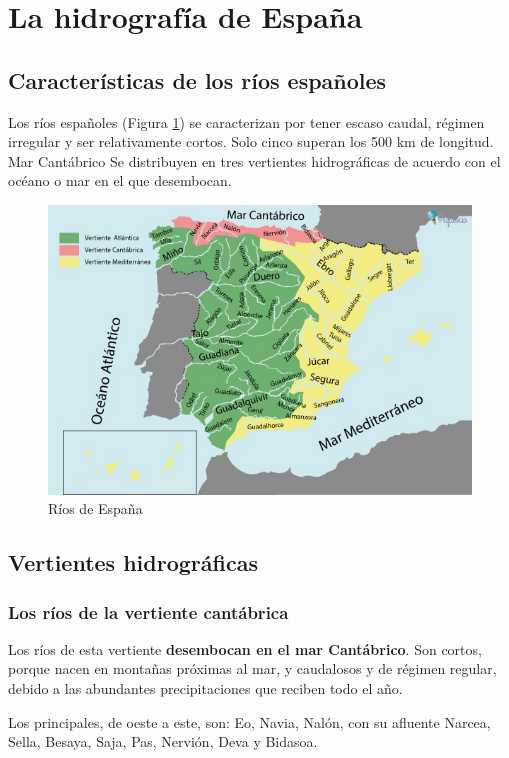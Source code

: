 \section{La hidrografía de España}

\subsection{Características de los ríos españoles}

Los ríos españoles (Figura \ref{fig:rios-espana}) se caracterizan por tener escaso caudal, régimen irregular y ser relativamente cortos. Solo cinco superan los 500 km de longitud. Mar Cantábrico Se distribuyen en tres vertientes hidrográficas de acuerdo con el océano o mar en el que desembocan.

\begin{figure}[!ht]
    \centering
    \includegraphics[width=0.7\linewidth]{Tema2/08_Rios-espana.jpg}
    \caption{Ríos de España}
    \label{fig:rios-espana}
\end{figure}

\subsection{Vertientes hidrográficas}

\subsubsection{Los ríos de la vertiente cantábrica}

Los ríos de esta vertiente \textbf{desembocan en el mar Cantábrico}. Son cortos, porque nacen en montañas próximas al mar, y caudalosos y de régimen regular, debido a las abundantes precipitaciones que reciben todo el año.

\vspace{3mm}
Los principales, de oeste a este, son: Eo, Navia, Nalón, con su afluente Narcea, Sella, Besaya, Saja, Pas, Nervión, Deva y Bidasoa.

